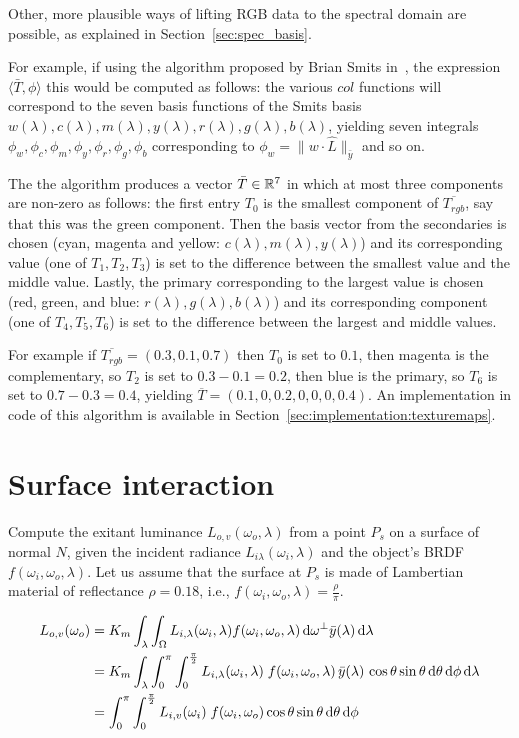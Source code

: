Other, more plausible ways of lifting \gls{RGB} data to the spectral domain
are possible, as explained in Section~\ref{sec:spec_basis}.

For example, if using the algorithm proposed by Brian Smits in~\cite{smits99},
the expression $\langle \bar T, \phi \rangle$ this would be computed as follows:
the various $col$ functions will correspond to the seven basis functions of the
Smits basis $w(λ), c(λ), m(λ), y(λ), r(λ), g(λ), b(λ)$, yielding seven integrals
$\phi_w, \phi_c, \phi_m, \phi_y, \phi_r, \phi_g, \phi_b$ corresponding to
$\phi_w =  \|w\cdot\hat{L}\|_{\bar y}$ and so on.

The the algorithm produces a vector $\bar T \in \mathbb{R}^7$ in which at most three
components are non-zero as follows: the first entry $T_0$ is the smallest component
of $\overline{T_{rgb}}$, say that this was the green component. Then the basis
vector from the secondaries is chosen (cyan, magenta and yellow: $c(\lambda), m(\lambda), y(\lambda)$)
and its corresponding value (one of $T_1, T_2, T_3$) is set to the difference
between the smallest value and the middle value. Lastly, the primary corresponding
to the largest value is chosen (red, green, and blue: $r(\lambda), g(\lambda), b(\lambda)$)
and its corresponding component (one of $T_4, T_5, T_6$) is set to the difference
between the largest and middle values.

For example if $\overline{T_{rgb}} = (0.3, 0.1, 0.7)$ then $T_0$ is set to $0.1$,
then magenta is the complementary, so $T_2$ is set to $0.3-0.1 = 0.2$, then
blue is the primary, so $T_6$ is set to $0.7 - 0.3 = 0.4$, yielding
$\overline{T} = (0.1, 0, 0.2, 0, 0, 0, 0.4)$. An implementation in code of
this algorithm is available in Section~\ref{sec:implementation:texturemaps}.

\section{Surface interaction}

Compute the exitant luminance $L_{o,v}(\omega_o, \lambda)$ from a point
$P_s$ on a surface of normal $N$, given the incident radiance
$L_{i\lambda}(\omega_i, \lambda)$ and the object’s BRDF $f(\omega_i, \omega_o, \lambda)$.
Let us assume that the surface at $P_s$ is made of Lambertian material of reflectance $\rho=0.18$, i.e., $f(\omega_i, \omega_o, \lambda) = \frac \rho \pi$. 

\begin{displaymath}
\begin{split}
    L_{o,v}(\omega_o) &= K_m \int_\lambda \int_\Omega L_{i,\lambda}(\omega_i, \lambda) f(\omega_i, \omega_o, \lambda) \d \omega^{\bot} \bar y(\lambda) \d\lambda \\
    &= K_m \int_\lambda \int_0^\pi \int_0^{\frac \pi 2}  L_{i,\lambda}(\omega_i, \lambda)\;f(\omega_i, \omega_o, \lambda)\, \bar y(\lambda)\, \cos\theta \sin\theta \d\theta \d\phi \d\lambda \\
    &= \int_0^\pi \int_0^{\frac \pi 2}  L_{i,v}(\omega_i)\;f(\omega_i, \omega_o)\cos\theta \sin\theta \d\theta \d\phi
\end{split}
\end{displaymath}

